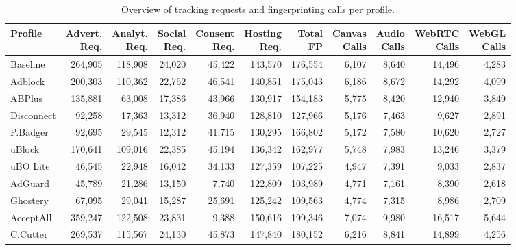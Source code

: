 \begin{table}[t]
\caption{Overview of tracking requests and fingerprinting calls per profile.}
\label{tab:tracking-summary}
\footnotesize
\begin{tabular}{lrrrrrrrrrr}
\toprule
\textbf{Profile} & \shortstack{\textbf{Advert.}\\\textbf{Req.}} & \shortstack{\textbf{Analyt.}\\\textbf{Req.}} & \shortstack{\textbf{Social}\\\textbf{Req.}} & \shortstack{\textbf{Consent}\\\textbf{Req.}} & \shortstack{\textbf{Hosting}\\\textbf{Req.}} & \shortstack{\textbf{Total}\\\textbf{FP}} & \shortstack{\textbf{Canvas}\\\textbf{Calls}} & \shortstack{\textbf{Audio}\\\textbf{Calls}} & \shortstack{\textbf{WebRTC}\\\textbf{Calls}} & \shortstack{\textbf{WebGL}\\\textbf{Calls}} \\
\midrule
Baseline & 264,905 & 118,908 & 24,020 & 45,422 & 143,570 & 176,554 & 6,107 & 8,640 & 14,496 & 4,283 \\
Adblock & 200,303 & 110,362 & 22,762 & 46,541 & 140,851 & 175,043 & 6,186 & 8,672 & 14,292 & 4,099 \\
ABPlus & 135,881 & 63,008 & 17,386 & 43,966 & 130,917 & 154,183 & 5,775 & 8,420 & 12,940 & 3,849 \\
Disconnect & 92,258 & 17,363 & 13,312 & 36,940 & 128,810 & 127,966 & 5,176 & 7,463 & 9,627 & 2,891 \\
P.Badger & 92,695 & 29,545 & 12,312 & 41,715 & 130,295 & 166,802 & 5,172 & 7,580 & 10,620 & 2,727 \\
uBlock & 170,641 & 109,016 & 22,385 & 45,194 & 136,342 & 162,977 & 5,748 & 7,983 & 13,246 & 3,379 \\
uBO Lite & 46,545 & 22,948 & 16,042 & 34,133 & 127,359 & 107,225 & 4,947 & 7,391 & 9,033 & 2,837 \\
AdGuard & 45,789 & 21,286 & 13,150 & 7,740 & 122,809 & 103,989 & 4,771 & 7,161 & 8,390 & 2,618 \\
Ghostery & 67,095 & 29,041 & 15,287 & 25,691 & 125,242 & 109,563 & 4,774 & 7,315 & 8,986 & 2,709 \\
AcceptAll & 359,247 & 122,508 & 23,831 & 9,388 & 150,616 & 199,346 & 7,074 & 9,980 & 16,517 & 5,644 \\
C.Cutter & 269,537 & 115,567 & 24,130 & 45,873 & 147,840 & 180,152 & 6,216 & 8,841 & 14,899 & 4,256 \\

\end{tabular}
\end{table}
